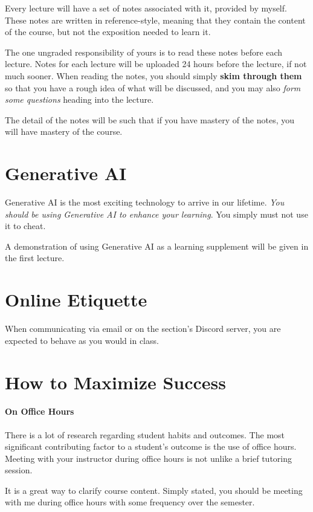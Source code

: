 \documentclass[letterpaper,twoside]{article}
\begin{document}
\begin{multicols*}{2}
    Every lecture will have a set of notes associated with it, provided by myself.
    These notes are written in reference-style, meaning that they contain the content of the course, but not the exposition needed to learn it.

    The one ungraded responsibility of yours is to read these notes before each lecture.
    Notes for each lecture will be uploaded 24 hours before the lecture, if not much sooner.
    When reading the notes, you should simply \textbf{skim through them} so that you have a rough idea of what will be discussed, and you may also \textit{form some questions} heading into the lecture. 
    
    The detail of the notes will be such that if you have mastery of the notes, you will have mastery of the course.

    \section*{Generative AI}

    Generative AI is the most exciting technology to arrive in our lifetime.
    \textit{You should be using Generative AI to enhance your learning}.
    You simply must not use it to cheat.

    A demonstration of using Generative AI as a learning supplement will be given in the first lecture.

    \section*{Online Etiquette}

    When communicating via email or on the section's Discord server, you are expected to behave as you would in class.

    \section*{How to Maximize Success}

    \paragraph{On Office Hours}
    There is a lot of research regarding student habits and outcomes.
    The most significant contributing factor to a student's outcome is the use of office hours.
    Meeting with your instructor during office hours is not unlike a brief tutoring session.

    It is a great way to clarify course content.
    Simply stated, you should be meeting with me during office hours with some frequency over the semester.


\end{multicols*}
\end{document}
